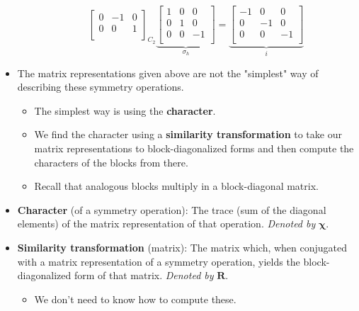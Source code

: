 \documentclass[../notes.tex]{subfiles}
\begin{document}
\begin{itemize}
\begin{itemize}
\begin{equation*}
{\begin{bmatrix}
                    0 & -1 & 0\\
                    0 & 0 & 1\\
                \end{bmatrix}
            }_{C_2}
            \underbrace{
                \begin{bmatrix}
                    1 & 0 & 0\\
                    0 & 1 & 0\\
                    0 & 0 & -1\\
                \end{bmatrix}
            }_{\sigma_h}
            =
            \underbrace{
                \begin{bmatrix}
                    -1 & 0 & 0\\
                    0 & -1 & 0\\
                    0 & 0 & -1\\
                \end{bmatrix}
            }_i
        \end{equation*}
    \end{itemize}
    \item The matrix representations given above are not the "simplest" way of describing these symmetry operations.
    \begin{itemize}
        \item The simplest way is using the \textbf{character}.
        \item We find the character using a \textbf{similarity transformation} to take our matrix representations to block-diagonalized forms and then compute the characters of the blocks from there.
        \item Recall that analogous blocks multiply in a block-diagonal matrix.
    \end{itemize}
    \item \textbf{Character} (of a symmetry operation): The trace (sum of the diagonal elements) of the matrix representation of that operation. \emph{Denoted by} $\bm{\chi}$.
    \item \textbf{Similarity transformation} (matrix): The matrix which, when conjugated with a matrix representation of a symmetry operation, yields the block-diagonalized form of that matrix. \emph{Denoted by} $\bm{R}$.
    \begin{itemize}
        \item We don't need to know how to compute these.
    \end{itemize}

\end{itemize}
\end{document}
